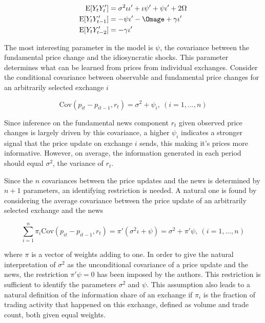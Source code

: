\documentclass[a4paper,12pt]{article}
\newcommand{\E}{\mathrm{E}}
\newcommand{\Cov}{\mathrm{Cov}}
\begin{document}
    \begin{equation}
      \begin{split}
        \E[Y_tY'_t] & = \sigma^2\iota\iota' + \iota\psi' + \psi\iota' + 2\Omega \\
        \E[Y_tY'_{t-1}] & = -\psi\iota' - \Omage + \gamma\iota' \\
        \E[Y_tY'_{t - 2}] & = -\gamma\iota'
      \end{split}
    \end{equation}

    The most interesting parameter in the model is $\psi$, the covariance between the fundamental price change and the idiosyncratic shocks. This parameter determines what can be learned from prices from individual exchanges. Consider the conditional covariance between observable and fundamental price changes for an arbitrarily selected exchange $i$

    \begin{equation}
      \Cov(p_{it} - p_{it-1}, r_t) = \sigma^2 + \psi_i, \ (i = 1, ..., n)
    \end{equation}

    Since inference on the fundamental news component $r_t$ given observed price changes is largely driven by this covariance, a higher $\psi_{i}$ indicates a stronger signal that the price update on exchange $i$ sends, this making it's prices more informative. However, on average, the information generated in each period should equal $\sigma^2$, the variance of $r_t$.

    Since the $n$ covariances between the price updates and the news is determined by $n + 1$ parameters, an identifying restriction is needed. A natural one is found by considering the average covariance between the price update of an arbitrarily selected exchange and the news

    \begin{equation}
      \sum_{i=1}^n \pi_i\Cov(p_{it} - p_{it-1}, r_t) = \pi'\left(\sigma^2\iota + \psi\right) = \sigma^2 + \pi'\psi, \ (i = 1,...,n)
    \end{equation}

    where $\pi$ is a vector of weights adding to one. In order to give the natural interpretation of $\sigma^2$ as the unconditional covariance of a price update and the news, the restriction $\pi'\psi = 0$ has been imposed by the authors. This restriction is sufficient to identify the parameters $\sigma^2$ and $\psi$. This assumption also leads to a natural definition of the information share of an exchange if $\pi_i$ is the fraction of trading activity that happened on this exchange, defined as volume and trade count, both given equal weights.
\end{document}
